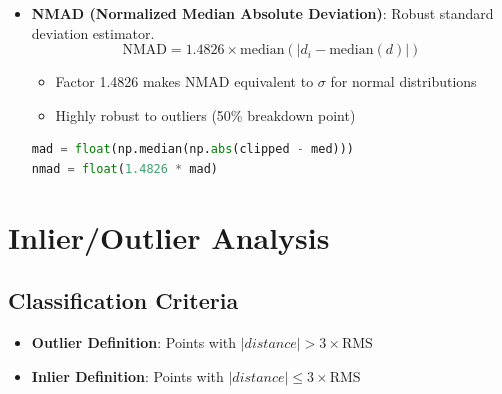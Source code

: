 \documentclass[12pt]{article}
\begin{document}
\begin{itemize}
    \item \textbf{NMAD (Normalized Median Absolute Deviation)}: Robust standard deviation estimator.
    \begin{equation}
        \text{NMAD} = 1.4826 \times \text{median}(|d_i - \text{median}(d)|)
    \end{equation}
    \begin{itemize}
        \item Factor 1.4826 makes NMAD equivalent to $\sigma$ for normal distributions
        \item Highly robust to outliers (50\% breakdown point)
    \end{itemize}
    \begin{lstlisting}[language=Python]
mad = float(np.median(np.abs(clipped - med)))
nmad = float(1.4826 * mad)
    \end{lstlisting}
\end{itemize}

\section{Inlier/Outlier Analysis}

\subsection{Classification Criteria}
\begin{itemize}
    \item \textbf{Outlier Definition}: Points with $|distance| > 3\times \text{RMS}$
    \item \textbf{Inlier Definition}: Points with $|distance| \leq 3\times \text{RMS}$
\end{itemize}
\end{document}

